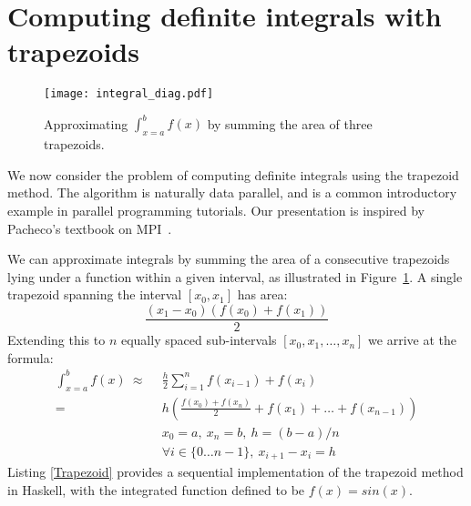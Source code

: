 \documentclass{tmr}
\begin{document}
\section{Computing definite integrals with trapezoids}

\begin{figure}[t]
\centering
\texttt{[image: integral\_diag.pdf]}
\caption{Approximating $\int_{x=a}^{b} f(x)$ by summing the area of three trapezoids.
\label{trapezoidfig}}
\end{figure}

We now consider the problem of computing definite integrals
using the trapezoid method. The algorithm is naturally data parallel, and is a common
introductory example in parallel programming tutorials. Our presentation is inspired by
Pacheco's textbook on MPI~\cite{Pacheco}.

We can approximate integrals by summing the area of a consecutive
trapezoids lying under a function within a given interval, as illustrated in
Figure~\ref{trapezoidfig}. A single trapezoid spanning the interval
$[x_0,x_1]$ has area:
\begin{equation*}
\frac{(x_1 - x_0)(f(x_0) + f(x_1))}{2}
\end{equation*}
Extending this to $n$ equally spaced sub-intervals $[x_0,x_1,\ldots,x_n]$ we arrive at the formula:
\begin{equation*}
\begin{split}
\int_{x=a}^{b} f(x)\ \approx\ &\ \frac{h}{2} \sum_{i=1}^n f(x_{i-1}) + f(x_i) \\[3mm]
                     =\  &\ h \left(\frac{f(x_0) + f(x_n)}{2} + f(x_1) + \ldots + f(x_{n-1})\right) \\[3mm]
                     &\ x_0 = a,\ x_n = b,\ h = (b - a)/n\\
                     &\ \forall i \in \{0 \ldots n-1\},\ x_{i+1} - x_{i} = h
\end{split}
\end{equation*}
Listing \ref{Trapezoid} provides a sequential implementation of the trapezoid method in Haskell, with
the integrated function defined to be
$f(x) = sin(x)$.
\end{document}
